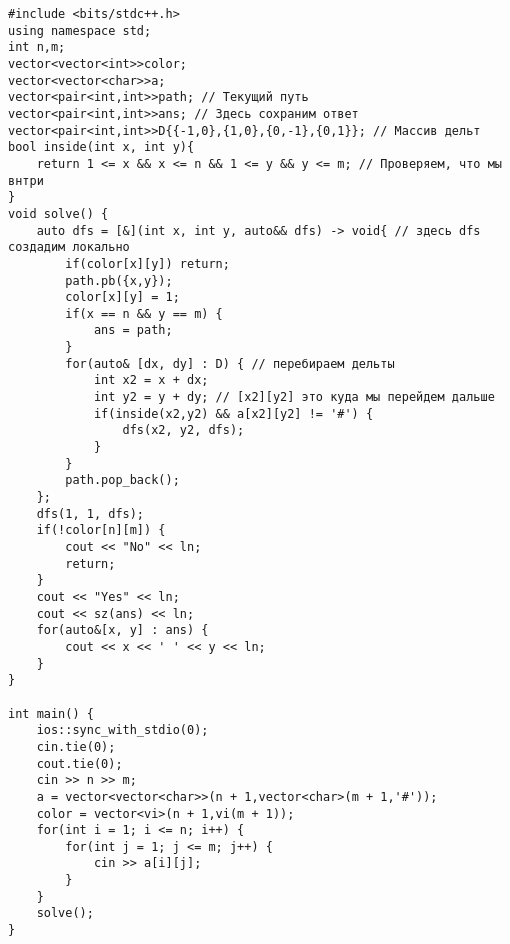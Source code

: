 \documentclass{article}
\begin{document}
\begin{verbatim}
#include <bits/stdc++.h>
using namespace std;
int n,m;
vector<vector<int>>color;
vector<vector<char>>a;
vector<pair<int,int>>path; // Текущий путь
vector<pair<int,int>>ans; // Здесь сохраним ответ
vector<pair<int,int>>D{{-1,0},{1,0},{0,-1},{0,1}}; // Массив дельт
bool inside(int x, int y){
    return 1 <= x && x <= n && 1 <= y && y <= m; // Проверяем, что мы внтри
}
void solve() {
    auto dfs = [&](int x, int y, auto&& dfs) -> void{ // здесь dfs создадим локально
        if(color[x][y]) return;
        path.pb({x,y});
        color[x][y] = 1;
        if(x == n && y == m) {
            ans = path;
        }
        for(auto& [dx, dy] : D) { // перебираем дельты
            int x2 = x + dx; 
            int y2 = y + dy; // [x2][y2] это куда мы перейдем дальше
            if(inside(x2,y2) && a[x2][y2] != '#') {
                dfs(x2, y2, dfs);
            }
        }
        path.pop_back();
    };
    dfs(1, 1, dfs);
    if(!color[n][m]) {
        cout << "No" << ln;
        return;
    }
    cout << "Yes" << ln;
    cout << sz(ans) << ln;
    for(auto&[x, y] : ans) {
        cout << x << ' ' << y << ln;
    }
}

int main() {
    ios::sync_with_stdio(0);
    cin.tie(0);
    cout.tie(0);
    cin >> n >> m;
    a = vector<vector<char>>(n + 1,vector<char>(m + 1,'#'));
    color = vector<vi>(n + 1,vi(m + 1));
    for(int i = 1; i <= n; i++) {
        for(int j = 1; j <= m; j++) {
            cin >> a[i][j];
        }
    }
    solve();
}
\end{verbatim}
\end{document}
